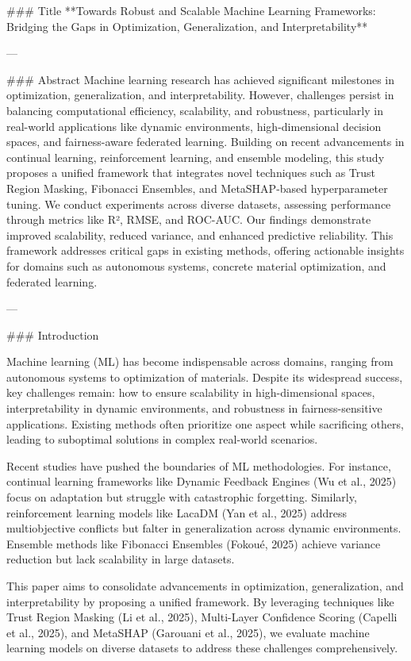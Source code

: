### Title  
**Towards Robust and Scalable Machine Learning Frameworks: Bridging the Gaps in Optimization, Generalization, and Interpretability**

---

### Abstract  
Machine learning research has achieved significant milestones in optimization, generalization, and interpretability. However, challenges persist in balancing computational efficiency, scalability, and robustness, particularly in real-world applications like dynamic environments, high-dimensional decision spaces, and fairness-aware federated learning. Building on recent advancements in continual learning, reinforcement learning, and ensemble modeling, this study proposes a unified framework that integrates novel techniques such as Trust Region Masking, Fibonacci Ensembles, and MetaSHAP-based hyperparameter tuning. We conduct experiments across diverse datasets, assessing performance through metrics like R², RMSE, and ROC-AUC. Our findings demonstrate improved scalability, reduced variance, and enhanced predictive reliability. This framework addresses critical gaps in existing methods, offering actionable insights for domains such as autonomous systems, concrete material optimization, and federated learning.  

---

### Introduction  

Machine learning (ML) has become indispensable across domains, ranging from autonomous systems to optimization of materials. Despite its widespread success, key challenges remain: how to ensure scalability in high-dimensional spaces, interpretability in dynamic environments, and robustness in fairness-sensitive applications. Existing methods often prioritize one aspect while sacrificing others, leading to suboptimal solutions in complex real-world scenarios.  

Recent studies have pushed the boundaries of ML methodologies. For instance, continual learning frameworks like Dynamic Feedback Engines (Wu et al., 2025) focus on adaptation but struggle with catastrophic forgetting. Similarly, reinforcement learning models like LacaDM (Yan et al., 2025) address multiobjective conflicts but falter in generalization across dynamic environments. Ensemble methods like Fibonacci Ensembles (Fokoué, 2025) achieve variance reduction but lack scalability in large datasets.  

This paper aims to consolidate advancements in optimization, generalization, and interpretability by proposing a unified framework. By leveraging techniques like Trust Region Masking (Li et al., 2025), Multi-Layer Confidence Scoring (Capelli et al., 2025), and MetaSHAP (Garouani et al., 2025), we evaluate machine learning models on diverse datasets to address these challenges comprehensively.  

